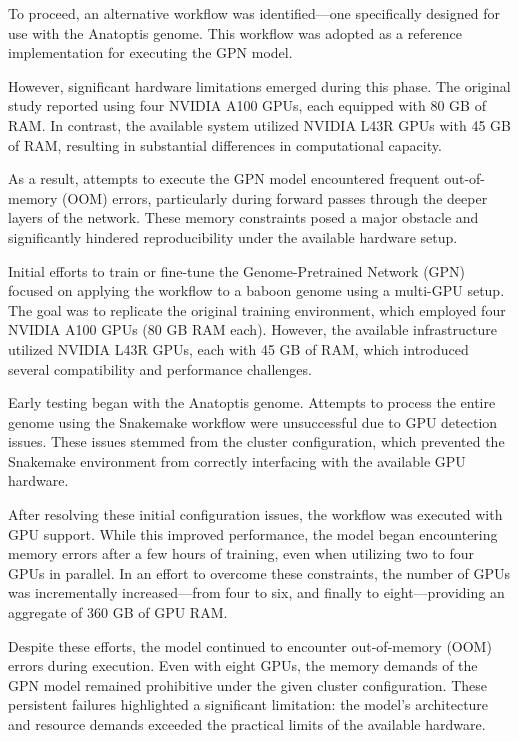 \documentclass[
  a4paper,
]{scrbook}
\begin{document}
To proceed, an alternative workflow was identified---one specifically
designed for use with the Anatoptis genome. This workflow was adopted as
a reference implementation for executing the GPN model.

However, significant hardware limitations emerged during this phase. The
original study reported using four NVIDIA A100 GPUs, each equipped with
80 GB of RAM. In contrast, the available system utilized NVIDIA L43R
GPUs with 45 GB of RAM, resulting in substantial differences in
computational capacity.

As a result, attempts to execute the GPN model encountered frequent
out-of-memory (OOM) errors, particularly during forward passes through
the deeper layers of the network. These memory constraints posed a major
obstacle and significantly hindered reproducibility under the available
hardware setup.

Initial efforts to train or fine-tune the Genome-Pretrained Network
(GPN) focused on applying the workflow to a baboon genome using a
multi-GPU setup. The goal was to replicate the original training
environment, which employed four NVIDIA A100 GPUs (80 GB RAM each).
However, the available infrastructure utilized NVIDIA L43R GPUs, each
with 45 GB of RAM, which introduced several compatibility and
performance challenges.

Early testing began with the Anatoptis genome. Attempts to process the
entire genome using the Snakemake workflow were unsuccessful due to GPU
detection issues. These issues stemmed from the cluster configuration,
which prevented the Snakemake environment from correctly interfacing
with the available GPU hardware.

After resolving these initial configuration issues, the workflow was
executed with GPU support. While this improved performance, the model
began encountering memory errors after a few hours of training, even
when utilizing two to four GPUs in parallel. In an effort to overcome
these constraints, the number of GPUs was incrementally increased---from
four to six, and finally to eight---providing an aggregate of 360 GB of
GPU RAM.

Despite these efforts, the model continued to encounter out-of-memory
(OOM) errors during execution. Even with eight GPUs, the memory demands
of the GPN model remained prohibitive under the given cluster
configuration. These persistent failures highlighted a significant
limitation: the model's architecture and resource demands exceeded the
practical limits of the available hardware.
\end{document}
